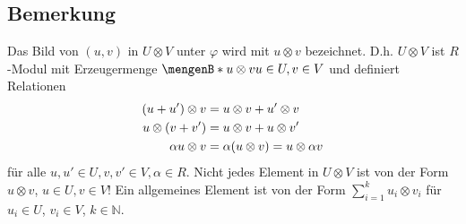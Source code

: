 \subsection[Bemerkung: Elemente und Erzeuger des Tensorprodukts, Modulstruktur des Tensorprodukts]{Bemerkung} %
\label{sub:32}
Das Bild von $(u,v)$ in $U \otimes V$ unter $\varphi$ wird mit $u \otimes v$ bezeichnet. D.h. $U \otimes V$ ist $R$-Modul mit Erzeugermenge 
$\set[u \otimes v]{u \in U, v \in V} $ und definiert Relationen
\begin{align*}
	(u+ u') \otimes v &= u \otimes v + u' \otimes v \\
	u \otimes (v+v') &= u \otimes v + u \otimes v' \\
	\alpha u \otimes v &=  \alpha \enbrace*{u \otimes v} = u \otimes \alpha v 
\end{align*}
für alle $u,u' \in U, v,v' \in V, \alpha \in R$. 
Nicht jedes Element in $U \otimes V$ ist von der Form $u \otimes v$, $u \in U, v \in V$! Ein allgemeines Element ist von der Form $\sum_{i=1}^{k} u_i \otimes v_i $ für
$u_i \in U$, $v_i \in V$, $k \in \mathds{N}$.

